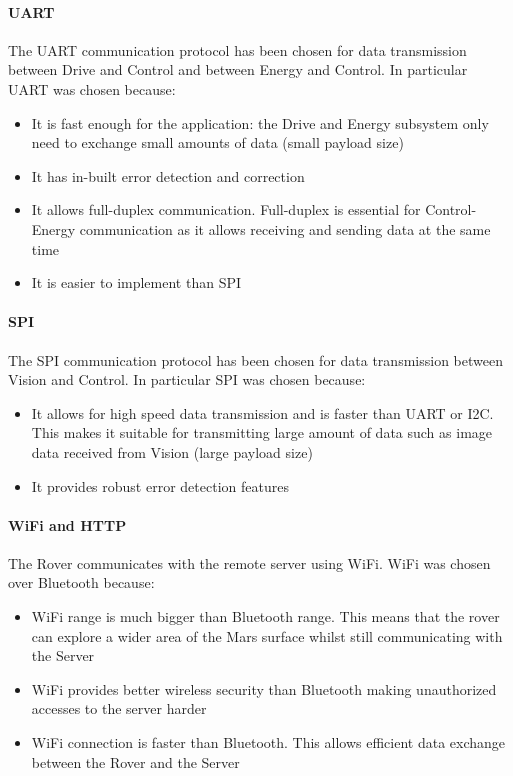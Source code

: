 \documentclass[10pt,twoside]{article}
\begin{document}
\paragraph{UART} The UART communication protocol has been chosen for data transmission between Drive and Control and between Energy and Control. 
In particular UART was chosen because: 
\begin{itemize}[noitemsep]
    \item It is fast enough for the application: the Drive and Energy subsystem only need to exchange small amounts of data (small payload size)
    \item It has in-built error detection and correction
    \item It allows full-duplex communication. Full-duplex is essential for Control-Energy communication as it allows receiving and sending data at the same time
    \item It is easier to implement than SPI
\end{itemize}


\paragraph{SPI} The SPI communication protocol has been chosen for data transmission between Vision and Control.
In particular SPI was chosen because: 
\begin{itemize}[noitemsep]
    \item It allows for high speed data transmission and is faster than UART or I2C. This makes it suitable for transmitting large amount of data such as image data received from Vision  (large payload size)
    \item It provides robust error detection features
\end{itemize}


\paragraph{WiFi and HTTP} The Rover communicates with the remote server using WiFi.
WiFi was chosen over Bluetooth because:
\begin{itemize}[noitemsep]
    \item WiFi range is much bigger than Bluetooth range. This means that the rover can explore a wider area of the Mars surface whilst still communicating with the Server
    \item WiFi provides better wireless security than Bluetooth making unauthorized accesses to the server harder
    \item WiFi connection is faster than Bluetooth. This allows efficient data exchange between the Rover and the Server
\end{itemize}
\end{document}
